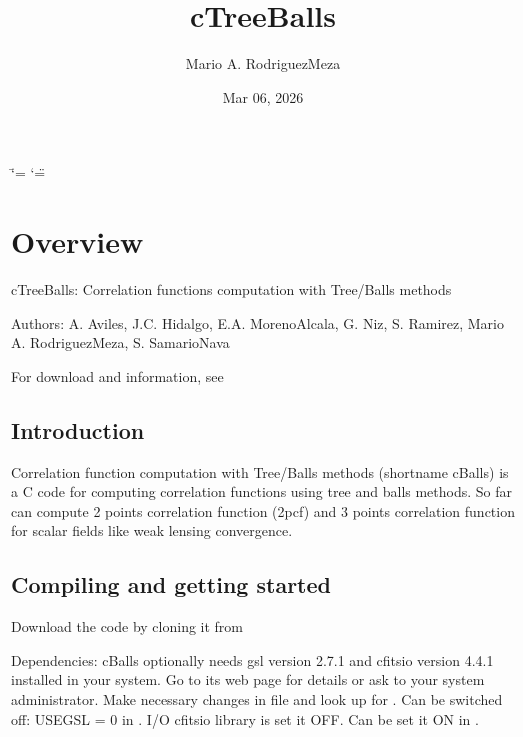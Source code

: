 \documentclass[letterpaper,10pt,english]{sphinxmanual}
\title{cTreeBalls}
\date{Mar 06, 2026}
\author{Mario A.\@{} Rodriguez\sphinxhyphen{}Meza}
\begin{document}
\ifdefined\shorthandoff
  \ifnum\catcode`\=\string=\active\shorthandoff{=}\fi
  \ifnum\catcode`\"=\active{}\fi
\fi

\pagestyle{empty}
\sphinxmaketitle
\pagestyle{plain}
\sphinxtableofcontents
\pagestyle{normal}
\label{\detokenize{index::doc}}


\sphinxstepscope


\chapter{Overview}
\label{\detokenize{overview:overview}}\label{\detokenize{overview::doc}}
\sphinxAtStartPar
cTreeBalls: Correlation functions computation with Tree/Balls methods

\sphinxAtStartPar
Authors: A. Aviles, J.C. Hidalgo, E.A. Moreno\sphinxhyphen{}Alcala, G. Niz, S. Ramirez, Mario A. Rodriguez\sphinxhyphen{}Meza, S. Samario\sphinxhyphen{}Nava

\sphinxAtStartPar
For download and information, see 


\section{Introduction}
\label{\detokenize{overview:introduction}}
\sphinxAtStartPar
Correlation function computation with Tree/Balls methods (short\sphinxhyphen{}name cBalls) is a C code for computing correlation functions using tree and balls methods. So far can compute 2 points correlation function (2pcf) and 3 points correlation function for scalar fields like weak lensing convergence.


\section{Compiling and getting started}
\label{\detokenize{overview:compiling-and-getting-started}}
\sphinxAtStartPar
Download the code by cloning it from 

\sphinxAtStartPar
Dependencies: cBalls optionally needs gsl version 2.7.1 and cfitsio version 4.4.1 installed in your system. Go to its web page  for details or ask to your system administrator. Make necessary changes in  file and look up for . Can be switched off: USEGSL = 0 in . I/O cfitsio library is set it OFF. Can be set it ON in .
\end{document}
